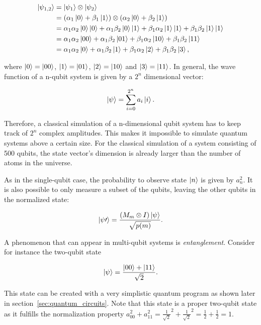 \begin{align}
  \Ket{\psi_{1,2}} &= \Ket{\psi_1} \otimes \Ket{\psi_2} \\
                   &= (\alpha_1 \Ket{0} + \beta_1 \Ket{1}) \otimes (\alpha_2 \Ket{0} + \beta_2 \Ket{1}) \\
                   &= \alpha_1 \alpha_2 \Ket{0}\Ket{0} + \alpha_1 \beta_2 \Ket{0} \Ket{1} + \beta_1 \alpha_2 \Ket{1} \Ket{1} + \beta_1 \beta_2 \Ket{1} \Ket{1} \\
                   &= \alpha_1 \alpha_2 \Ket{00} + \alpha_1 \beta_2 \Ket{01} + \beta_1 \alpha_2 \Ket{10} + \beta_1 \beta_2 \Ket{11} \\
                   &= \alpha_1 \alpha_2 \Ket{0} + \alpha_1 \beta_2 \Ket{1} + \beta_1 \alpha_2 \Ket{2} + \beta_1 \beta_2 \Ket{3},
\end{align}

where $\Ket{0} = \Ket{00}$, $\Ket{1} = \Ket{01}$, $\Ket{2} = \Ket{10}$
and $\Ket{3} = \Ket{11}$. In general, the wave function of a
n-qubit system is given by a $2^n$ dimensional vector:

\begin{equation}
  \Ket{\psi} = \sum_{i=0}^{2^n}a_i \Ket{i}.
\end{equation}

Therefore, a classical simulation of a n-dimensional qubit system has to keep
track of $2^n$ complex amplitudes. This makes it impossible to simulate quantum
systems above a certain size. For the classical simulation of a system
consisting of 500 qubits, the state vector's dimension is already larger
than the number of atoms in the universe.  

As in the single-qubit case, the probability to observe state $\Ket{n}$ is
given by $a_n^2$. It is also possible to only measure a subset of the qubits,
leaving the other qubits in the normalized state:

\begin{equation}
  \Ket{\psi\prime} = \frac{(M_m \otimes I) \Ket{\psi}}{\sqrt{p(m)}}.
\end{equation}

A phenomenon that can appear in multi-qubit systems is
\textit{entanglement}. Consider for instance the two-qubit state

\begin{equation}
  \Ket{\psi} = \frac{\Ket{00} + \Ket{11}}{\sqrt{2}}.
\end{equation}

This state can be created with a very simplistic quantum program as shown later in
section~\ref{sec:quantum_circuits}.
Note that this state is a proper two-qubit state as it fulfills the
normalization property
$a_{00}^2 + a_{11}^2 = \frac{1}{\sqrt{2}}^2 + \frac{1}{\sqrt{2}}^2 = \frac{1}{2}
+ \frac{1}{2} = 1$.

